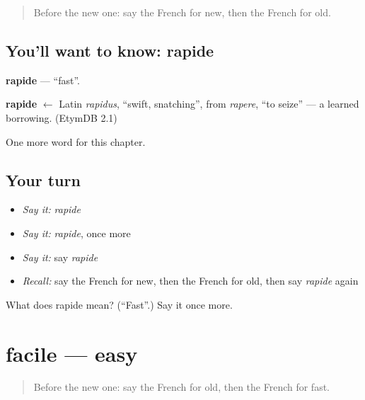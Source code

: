 \label{lesson:FR-C89-rapide}



\begin{quote}
Before the new one: say the French for new, then the French for old.
\end{quote}

\subsection*{You'll want to know: rapide}
\textbf{rapide} — \textquotedblleft{}fast\textquotedblright{}.

\begin{cousinweb}
\textbf{rapide} $\leftarrow$ Latin \emph{rapidus}, \textquotedblleft{}swift, snatching\textquotedblright{}, from \emph{rapere}, \textquotedblleft{}to seize\textquotedblright{} — a learned borrowing. (EtymDB 2.1)
\end{cousinweb}

\begin{grammarlens}[title={What you've built}]
One more word for this chapter.
\end{grammarlens}

\subsection*{Your turn}
\begin{itemize}
\raggedright
  \item \emph{Say it:} \emph{rapide}
  \item \emph{Say it:} \emph{rapide}, once more
  \item \emph{Say it:} say \emph{rapide}
  \item \emph{Recall:} say the French for new, then the French for old, then say \emph{rapide} again
\end{itemize}

\begin{tcolorbox}[breakable,colback=teal!4,colframe=teal!35!black,title={Before you move on}]
What does rapide mean? (\textquotedblleft{}Fast\textquotedblright{}.) Say it once more.
\end{tcolorbox}
\section[facile]{facile — easy}

\label{lesson:FR-C89-facile}



\begin{quote}
Before the new one: say the French for old, then the French for fast.
\end{quote}

